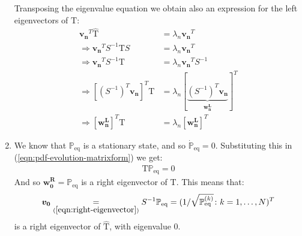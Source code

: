 \documentclass[../../main.tex]{subfiles}
\begin{document}
\begin{enumerate}
    Transposing the eigenvalue equation we obtain also an expression for the left eigenvectors of $\mathrm{T}$:
    \begin{align}\nonumber
        \bm{v_n}^T \hat{\mathrm{T}} &= \lambda_n \bm{v_n}^T\\
        \Rightarrow  \bm{v_n}^T S^{-1} \mathrm{T} S &=  \lambda_n \bm{v_n}^T\\ \nonumber
        \Rightarrow \bm{v_n}^T S^{-1} \mathrm{T} &= \lambda_n \bm{v_n}^T S^{-1}\\ \nonumber
        \Rightarrow [(S^{-1})^T \bm{v_n}]^T \mathrm{T} &= \lambda_n [\underbrace{(S^{-1})^T \bm{v_n}}_{\bm{w_n^L}}]^T \\
        \Rightarrow [\bm{w_n^L}]^T \mathrm{T} &= \lambda_n [\bm{w_n^L}]^T 
        \label{eqn:left-eigenvector}
    \end{align}
    \item We know that $\mathbb{P}_{\mathrm{eq}}$ is a stationary state, and so $\dot{\mathbb{P}}_{\mathrm{eq}} = 0$. Substituting this in (\ref{eqn:pdf-evolution-matrixform}) we get:
    \begin{align}\label{eqn:Peq-stationarity}
        \mathrm{T} \mathbb{P}_{\mathrm{eq}} = 0
    \end{align}
    And so $\bm{w_0^R} = \mathbb{P}_{\mathrm{eq}}$ is a right eigenvector of $\mathrm{T}$. This means that:
    \begin{align*}
        \bm{v_0} \underset{(\ref{eqn:right-eigenvector})}{=}  S^{-1} \mathbb{P}_{\mathrm{eq}} = (1/\sqrt{\mathbb{P}_{\mathrm{eq}}^{(k)}} \colon k = 1,\dots,N)^T
    \end{align*}
     is a right eigenvector of $\hat{\mathrm{T}}$, with eigenvalue $0$.

    \medskip


\end{enumerate}
\end{document}
